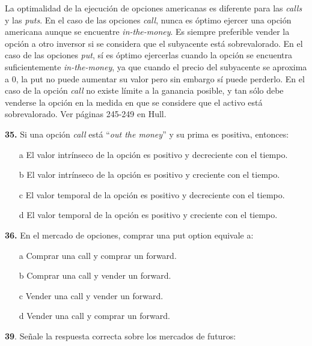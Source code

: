 \documentclass{nuevotema}
\begin{document}
La optimalidad de la ejecución de opciones americanas es diferente para las \textit{calls} y las \textit{puts}. En el caso de las opciones \textit{call}, nunca es óptimo ejercer una opción americana aunque se encuentre \textit{in-the-money}. Es siempre preferible vender la opción a otro inversor si se considera que el subyacente está sobrevalorado. En el caso de las opciones \textit{put}, sí es óptimo ejercerlas cuando la opción se encuentra suficientemente \textit{in-the-money}, ya que cuando el precio del subyacente se aproxima a 0, la put no puede aumentar su valor pero sin embargo sí puede perderlo. En el caso de la opción \textit{call} no existe límite a la ganancia posible, y tan sólo debe venderse la opción en la medida en que se considere que el activo está sobrevalorado. Ver páginas 245-249 en Hull.

\preguntas

\textbf{35.} Si una opción \textit{call} está ``\textit{out the money}'' y su prima es positiva, entonces:

\begin{itemize}
	\item[a] El valor intrínseco de la opción es positivo y decreciente con el tiempo.
	\item[b] El valor intrínseco de la opción es positivo y creciente con el tiempo.
	\item[c] El valor temporal de la opción es positivo y decreciente con el tiempo.
	\item[d] El valor temporal de la opción es positivo y creciente con el tiempo.
\end{itemize}


\textbf{36.} En el mercado de opciones, comprar una put option equivale a:

\begin{itemize}
	\item[a] Comprar una call y comprar un forward.
	\item[b] Comprar una call y vender un forward.
	\item[c] Vender una call y vender un forward.
	\item[d] Vender una call y comprar un forward.
\end{itemize}


\textbf{39}. Señale la respuesta correcta sobre los mercados de futuros:
\end{document}

